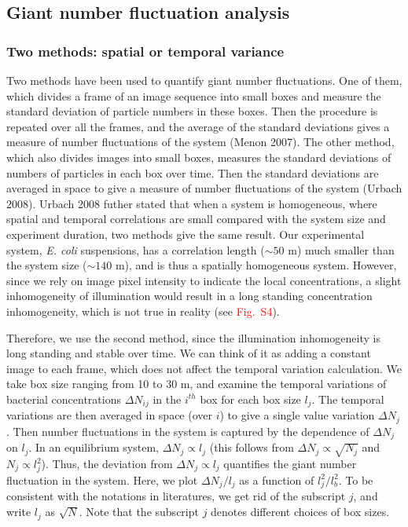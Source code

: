\documentclass[preprint,aps,prl,amsmath,amssymb,longbibliography]{revtex4-2}
\begin{document}
\subsection{Giant number fluctuation analysis}
\label{sec:method_gnf}

\subsubsection{Two methods: spatial or temporal variance}
Two methods have been used to quantify giant number fluctuations. One of them, which divides a frame of an image sequence into small boxes and measure the standard deviation of particle numbers in these boxes. Then the procedure is repeated over all the frames, and the average of the standard deviations gives a measure of number fluctuations of the system (Menon 2007). The other method, which also divides images into small boxes, measures the standard deviations of numbers of particles in each box over time. Then the standard deviations are averaged in space to give a measure of number fluctuations of the system (Urbach 2008). Urbach 2008 futher stated that when a system is homogeneous, where spatial and temporal correlations are small compared with the system size and experiment duration, two methods give the same result. Our experimental system, \textit{E. coli} suspensions, has a correlation length ($\sim 50$ \textmu m) much smaller than the system size ($\sim 140$ \textmu m), and is thus a spatially homogeneous system. However, since we rely on image pixel intensity to indicate the local concentrations, a slight inhomogeneity of illumination would result in a long standing concentration inhomogeneity, which is not true in reality (see \textcolor{red}{Fig.~S4}).

Therefore, we use the second method, since the illumination inhomogeneity is long standing and stable over time. We can think of it as adding a constant image to each frame, which does not affect the temporal variation calculation. We take box size ranging from 10 to 30 \textmu m, and examine the temporal variations of bacterial concentrations $\Delta N_{ij}$ in the $i^{th}$ box for each box size $l_j$. The temporal variations are then averaged in space (over $i$) to give a single value variation $\Delta N_{j}$. Then number fluctuations in the system is captured by the dependence of $\Delta N_{j}$ on $l_j$. In an equilibrium system, $\Delta N_{j}\propto l_j$ (this follows from $\Delta N_{j}\propto \sqrt{N_j}$ and $N_j\propto l_j^2$). Thus, the deviation from $\Delta N_{j}\propto l_j$ quantifies the giant number fluctuation in the system. Here, we plot $\Delta N_{j}/l_j$ as a function of $l_j^2/l_b^2$. To be consistent with the notations in literatures, we get rid of the subscript $j$, and write $l_j$ as $\sqrt{N}$. Note that the subscript $j$ denotes different choices of box sizes.
\end{document}

